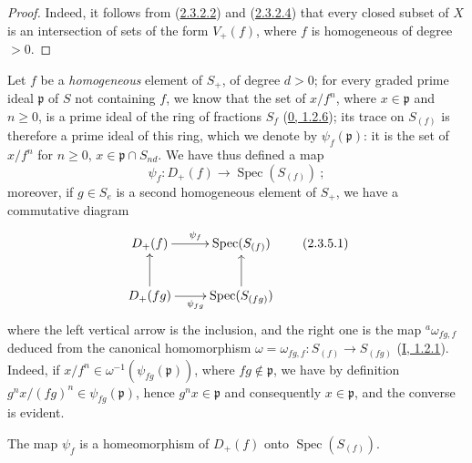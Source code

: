 \begin{proof}
Indeed, it follows from (\hyperref[II.2.3.2.2]{2.3.2.2}) and
(\hyperref[II.2.3.2.4]{2.3.2.4}) that every closed subset of $X$ is an
intersection of sets of the form $V_+(f)$, where $f$ is homogeneous of
degree $>0$.
\end{proof}

\begin{env}[2.3.5]
\label{II.2.3.5}
Let $f$ be a \emph{homogeneous} element of $S_+$, of degree $d>0$; for
every graded prime ideal $\mathfrak{p}$ of $S$ not containing $f$, we know
that the set of $x/f^n$, where $x\in\mathfrak{p}$ and $n\geq 0$, is a
prime ideal of the ring of fractions $S_f$
(\hyperref[0.1.2.6]{0, 1.2.6}); its trace on $S_{(f)}$ is therefore a
prime ideal of this ring, which we denote by
$\psi_f(\mathfrak{p})$: it is the set of $x/f^n$ for $n\geq 0$,
$x\in\mathfrak{p}\cap S_{nd}$. We have thus defined a map
\[
  \psi_f:D_+(f)\longrightarrow\operatorname{Spec}(S_{(f)})~;
\]
moreover, if $g\in S_e$ is a second homogeneous element of $S_+$, we have a
commutative diagram
\[
  \label{II.2.3.5.1}
  \xymatrix{
    D_+(f)\ar[r]^{\psi_f}
    & \operatorname{Spec}(S_{(f)})\\
    D_+(fg)\ar[u]\ar[r]_{\psi_{fg}}
    & \operatorname{Spec}(S_{(fg)})\ar[u]
  }
  \tag{2.3.5.1}
\]
where the left vertical arrow is the inclusion, and the right one is
the map ${}^a\omega_{fg,f}$ deduced from the canonical homomorphism
$\omega=\omega_{fg,f}:S_{(f)}\to S_{(fg)}$
(\hyperref[I.1.2.1]{I, 1.2.1}). Indeed, if
$x/f^n\in\omega^{-1}(\psi_{fg}(\mathfrak{p}))$, where
$fg\notin\mathfrak{p}$, we have by definition
$g^n x/(fg)^n\in\psi_{fg}(\mathfrak{p})$, hence
$g^n x\in\mathfrak{p}$ and consequently $x\in\mathfrak{p}$, and the converse
is evident.
\end{env}

\begin{proposition}[2.3.6]
\label{II.2.3.6}
The map $\psi_f$ is a homeomorphism of $D_+(f)$ onto
$\operatorname{Spec}(S_{(f)})$.
\end{proposition}


